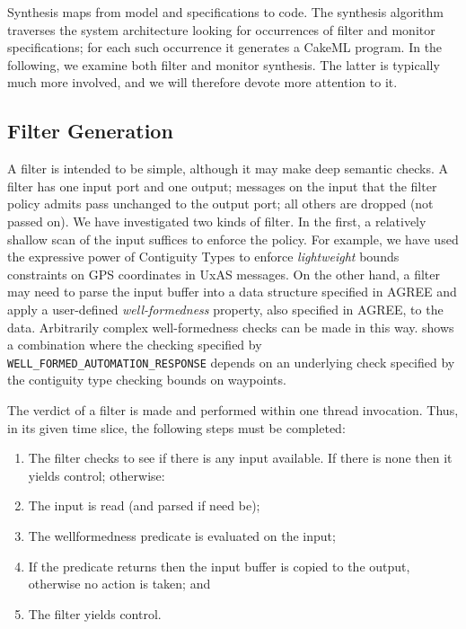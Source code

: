 Synthesis maps from model and specifications to code. The synthesis
algorithm traverses the system architecture looking for occurrences of
filter and monitor specifications;  for each such occurrence it
generates a CakeML program. In the following, we examine both filter
and monitor synthesis. The latter is typically much more involved, and
we will therefore devote more attention to it.

\subsection{Filter Generation}

A filter is intended to be simple, although it may make deep semantic
checks. A filter has one input port and one output; messages on the
input that the filter policy admits pass unchanged to the output port;
all others are dropped (not passed on). We have investigated two kinds
of filter. In the first, a relatively shallow scan of the input
suffices to enforce the policy. For example, we have used the
expressive power of Contiguity Types \cite{contiguity-types} to
enforce \emph{lightweight} bounds constraints on GPS coordinates in
UxAS messages. On the other hand, a filter may need to parse the input
buffer into a data structure specified in AGREE and apply a
user-defined \emph{well-formedness} property, also specified in AGREE,
to the data. Arbitrarily complex well-formedness checks can be made in
this way.  shows a combination where the
checking specified by {\small\verb+WELL_FORMED_AUTOMATION_RESPONSE+}
depends on an underlying check specified by the contiguity type
checking bounds on waypoints.

The verdict of a filter is made and performed within one thread
invocation. Thus, in its given time slice, the
following steps must be completed:

\begin{enumerate}

\item The filter checks to see if there is any input available.  If there is none
then it yields control; otherwise:

\item The input is read (and parsed if need be);

\item The wellformedness predicate is evaluated on the input;

\item If the predicate returns  then the input buffer
 is copied to the output, otherwise no action is taken; and

\item The filter yields control.
\end{enumerate}

